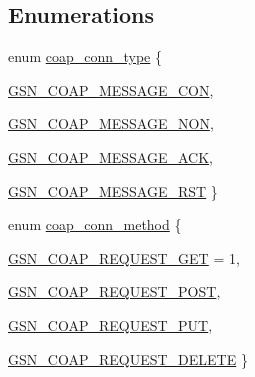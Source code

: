 \subsection*{Enumerations}
\begin{DoxyCompactItemize}
\item 
enum \hyperlink{a00538_a4d3cbe1c9f1d4b500c83635a57a37d94}{coap\_\-conn\_\-type} \{ \par
\hyperlink{a00538_a4d3cbe1c9f1d4b500c83635a57a37d94ab9cca17d1919b71523373917d0acb146}{GSN\_\-COAP\_\-MESSAGE\_\-CON}, 
\par
\hyperlink{a00538_a4d3cbe1c9f1d4b500c83635a57a37d94a4cc17b37ccdcbbd6f8c10a3470940938}{GSN\_\-COAP\_\-MESSAGE\_\-NON}, 
\par
\hyperlink{a00538_a4d3cbe1c9f1d4b500c83635a57a37d94a7ef08197861cfb461e562bd6afc2c243}{GSN\_\-COAP\_\-MESSAGE\_\-ACK}, 
\par
\hyperlink{a00538_a4d3cbe1c9f1d4b500c83635a57a37d94a5d0277d791861a00ed38181ac231918d}{GSN\_\-COAP\_\-MESSAGE\_\-RST}
 \}
\item 
enum \hyperlink{a00538_a60b3db981099ef05a78fd3a008890d4a}{coap\_\-conn\_\-method} \{ \par
\hyperlink{a00538_a60b3db981099ef05a78fd3a008890d4aa846d070ff3076a1981e2f25f465a5a4f}{GSN\_\-COAP\_\-REQUEST\_\-GET} =  1, 
\par
\hyperlink{a00538_a60b3db981099ef05a78fd3a008890d4aa215a75187585dba92162ab15832a9719}{GSN\_\-COAP\_\-REQUEST\_\-POST}, 
\par
\hyperlink{a00538_a60b3db981099ef05a78fd3a008890d4aa58d8c19487f6cda3a4ede569f401b631}{GSN\_\-COAP\_\-REQUEST\_\-PUT}, 
\par
\hyperlink{a00538_a60b3db981099ef05a78fd3a008890d4aa5f9b0565648501d85f6fd47bc47b8b86}{GSN\_\-COAP\_\-REQUEST\_\-DELETE}
 \}
\end{DoxyCompactItemize}
